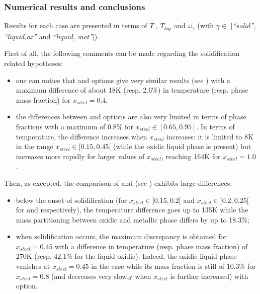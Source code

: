 \subsubsection{Numerical results and conclusions} \label{sect:numres}

Results for each case are presented in terms of $\bar{\temperature{}}$, $\temperature{liq}$ and $\omega_\gamma$ (with $\gamma \in $ [\textit{``solid''}, \textit{``liquid,ox''} and \textit{``liquid, met''}]).

First of all, the following comments can be made regarding the solidification related hypotheses:
\begin{itemize}
 \item one can notice that  and  options give very similar results (see ) with a maximum difference of about 18K (resp. 2.6\%) in temperature (resp. phase mass fraction) for $x_{steel}=0.4$;
 \item the differences between  and  options are also very limited in terms of phase fractions with a maximum of 0.8\% for $x_{steel}\in[0.65, 0.95]$. In terms of temperature, the difference increases when $x_{steel}$ increases: it is limited to 8K in the range $x_{steel}\in[0.15, 0.45[$ (while the oxidic liquid phase is present) but increases more rapidly for larger values of $x_{steel}$, reaching 164K for $x_{steel}=1.0$.
\end{itemize}
Then, as excepted, the comparison of  and  (see ) exhibits large differences:
\begin{itemize}
 \item below the onset of solidification (for $x_{steel}\in]0.15, 0.2[$ and $x_{steel}\in]0.2, 0.25[$ for  and  respectively), the temperature difference goes up to 135K while the mass partitioning between oxidic and metallic phase differs by up to 18.3\%;
 \item when solidification occurs, the maximum discrepancy is obtained for $x_{steel}=0.45$ with a difference in temperature (resp. phase mass fraction) of 270K (resp. 42.1\% for the liquid oxidic). Indeed, the oxidic liquid phase vanishes at $x_{steel}=0.45$ in the  case while its mass fraction is still of 10.3\% for $x_{steel}=0.8$ (and decreases very slowly when $x_{steel}$ is further increased) with  option.
\end{itemize}
